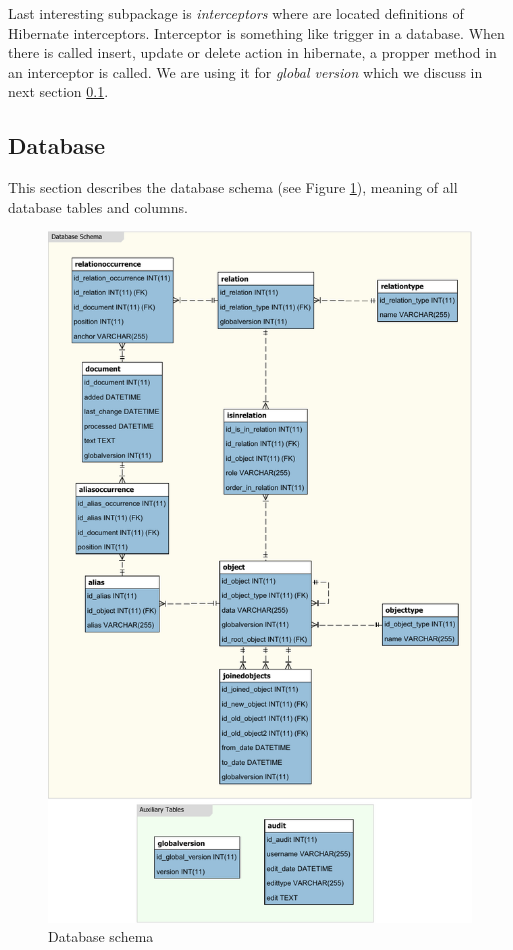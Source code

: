 
Last interesting subpackage is \emph{interceptors} where are located definitions
of Hibernate interceptors. Interceptor is something like trigger in a database.
When there is called insert, update or delete action in hibernate, a propper method
in an interceptor is called. We are using it for \emph{global version} which we
discuss in next section \ref{sec:Database}.

\subsection{Database}
\label{sec:Database}

This section describes the database schema (see Figure \ref{fig:DatabaseSchema}), meaning of all database tables and columns.

\begin{figure}[!htb]
        \centering
        \includegraphics[width=\textwidth, 
        				 height=(\textheight - 2cm), 
        				 keepaspectratio]
        				 {Images/DatabaseSchemaPortrait-crop}
        \caption{Database schema}
        \label{fig:DatabaseSchema}
\end{figure}

